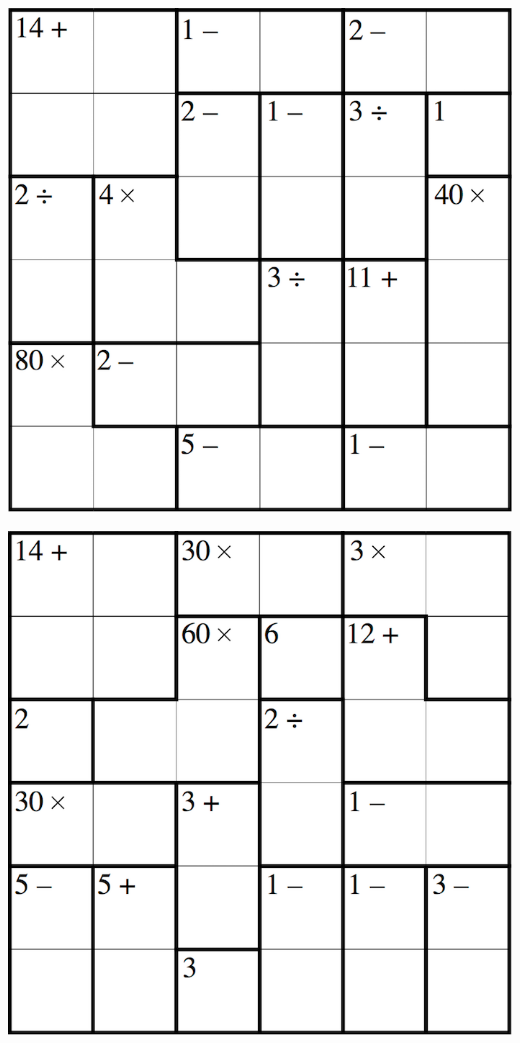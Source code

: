 
\includegraphics[scale=1]{Gambar/Lampiran/6x6_9.png}

\includegraphics[scale=1]{Gambar/Lampiran/6x6_10.png}
